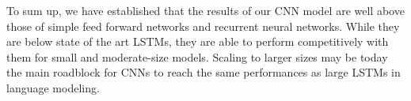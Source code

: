 


To sum up, we have established that the results of our CNN model are
well above those of simple feed forward networks and recurrent neural
networks. While they are below state of the art LSTMs, they are able
to perform competitively with them for small and moderate-size
models. Scaling to larger sizes may be today the main roadblock 
for CNNs to reach the same performances
as large LSTMs in language modeling. %
